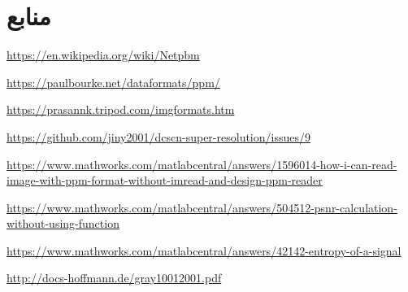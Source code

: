 \documentclass{article}
\begin{document}
	

	
	\newpage
	
	\section*{منابع}
	\renewcommand{\section}[2]{}%
	\begin{thebibliography}{99} 
		
		\begin{latin}
		
		
		\begin{LTRitems}
			
			\resetlatinfont
			

			
				\url{https://en.wikipedia.org/wiki/Netpbm}
				
					\url{https://paulbourke.net/dataformats/ppm/}
					
						\url{https://prasannk.tripod.com/imgformats.htm}
						
						\url{https://github.com/jiny2001/dcscn-super-resolution/issues/9}
						
						\url{https://www.mathworks.com/matlabcentral/answers/1596014-how-i-can-read-image-with-ppm-format-without-imread-and-design-ppm-reader}
						
						\url{https://www.mathworks.com/matlabcentral/answers/504512-psnr-calculation-without-using-function}
						
						\url{https://www.mathworks.com/matlabcentral/answers/42142-entropy-of-a-signal}
						
						
						\url{http://docs-hoffmann.de/gray10012001.pdf}
						
						
						
		\end{LTRitems}
	\end{latin}
		
	\end{thebibliography}
	
	
\end{document}
